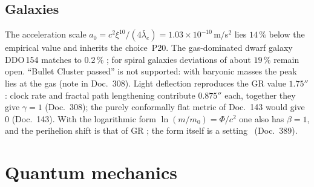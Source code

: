 \subsection{Galaxies}

The acceleration scale $a_0=c^2\xi^{10}/(4\bar\lambda_e)=1.03\times10^{-10}$\,m/s$^2$ lies
$14\,\%$ below the empirical value and inherits the choice~P20. The gas-dominated dwarf galaxy
DDO\,154 matches to $0.2\,\%$ \KM; for spiral galaxies deviations of about $19\,\%$ remain open.
``Bullet Cluster passed'' is not supported: with baryonic masses the peak lies at the gas (note
in Doc.~308). Light deflection reproduces the GR value $1.75''$ \KM: clock rate and fractal path
lengthening contribute $0.875''$ each, together they give $\gamma=1$ (Doc.~308); the purely
conformally flat metric of Doc.~143 would give $0$ (Doc.~143). With the logarithmic form
$\ln(m/m_0)=\Phi/c^2$ one also has $\beta=1$, and the perihelion shift is that of GR \KM; the form
itself is a setting \SM\ (Doc.~389).

\section{Quantum mechanics}

